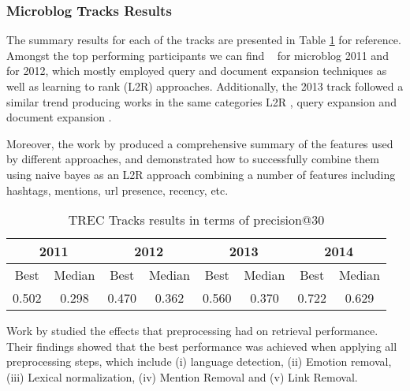 \subsubsection{Microblog Tracks Results}
The summary results for each of the tracks are presented in Table \ref{summarytrec} for reference. Amongst the top performing participants we can find ~\cite{amati2011fub,li2011pris,metzler2011usc} for microblog 2011 and ~\cite{kimovercoming,younosFreq,hanhit} for 2012, which mostly employed query and document expansion techniques as well as learning to rank (L2R) approaches.
Additionally, the 2013 track followed a similar trend producing works in the same categories L2R \cite{pris2013,gaoictnet}, query expansion \cite{prebjut,perezuniversity} and document expansion \cite{jabeuririt}.

Moreover, the work by \cite{Damak:2013:ESF:2480362.2480537} produced a comprehensive summary of the features used by different approaches, and demonstrated how to successfully combine them using naive bayes as an L2R approach combining a number of features including hashtags, mentions, url presence, recency, etc.


\begin{table}[]
	\centering
	
	\caption{TREC Tracks results in terms of precision@30}
	
	\begin{tabular}{|c|c|c|c|c|c|c|c|}
		\hline
		\multicolumn{2}{|c|}{2011} &\multicolumn{2}{|c|}{2012} & \multicolumn{2}{|c|}{2013} & \multicolumn{2}{|c|}{2014} \\
		\hline
		Best & Median & Best & Median &	Best & Median &	Best & Median \\
		0.502 & 0.298 & 0.470 & 0.362 & 0.560 & 0.370 & 0.722 & 0.629 \\
		\hline
		
	\end{tabular}
	
	\label{summarytrec}
	\vspace{0.5cm}
\end{table}

Work by \cite{thomassearching} studied the effects that preprocessing had on retrieval performance. Their findings showed that the best performance was achieved when applying all preprocessing steps, which include (i) language detection, (ii) Emotion removal, (iii) Lexical normalization, (iv) Mention Removal and (v) Link Removal. 


